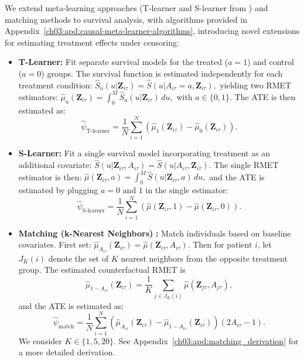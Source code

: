 We extend meta-learning approaches (T-learner and S-learner from \citet{kunzel2019metalearners}) and matching methods to survival analysis, with algorithms provided in Appendix~\ref{ch03:apd:causal-meta-learner-algorithms}, introducing novel extensions for estimating treatment effects under censoring:
\begin{itemize}\setlength{\itemsep}{0pt}
    \item \textbf{T-Learner:}
    Fit separate survival models for the treated (\(a=1\)) and control (\(a=0\)) groups. 
    The survival function is estimated independently for each treatment condition:
    \(
    \widehat{S}_a (u | \mathbf{Z}_{i\tau}) = {\widehat{S}(u | A_{i\tau} = a, \mathbf{Z}_{i\tau})},
    \)
    yielding two RMET estimators:
    \(
    \widehat{\mu}_a (\mathbf{Z}_{i\tau}) = \int_0^{M} \widehat{S}_a (u | \mathbf{Z}_{i\tau}) \, du,
    \)
    with \(a\in\{0,1\}\).
The ATE is then estimated as:
    \[
    \widehat{\psi}_{\text{T-learner}} = \frac{1}{N} \sum_{i=1}^{N} \left( \widehat{\mu}_1 (\mathbf{Z}_{i\tau}) - \widehat{\mu}_0 (\mathbf{Z}_{i\tau}) \right).
    \]

    \item \textbf{S-Learner:} Fit a single survival model incorporating treatment as an additional covariate:
    \(
    \widehat{S}(u | \mathbf{Z}_{i\tau}, A_{i\tau}) = \widehat{S}(u | A_{i\tau}, \mathbf{Z}_{i\tau}).
    \)
    The single RMET estimator is then:
    \(
    \widehat{\mu} (\mathbf{Z}_{i\tau}, a) = \int_0^{M} \widehat{S}(u | \mathbf{Z}_{i\tau}, a) \, du,
    \)
    and the ATE is estimated by plugging \(a=0\text{ and } 1\) in the single estimator:
    \[
    \widehat{\psi}_{\text{S-learner}} = \frac{1}{N} \sum_{i=1}^{N} \left( \widehat{\mu} (\mathbf{Z}_{i\tau},1) - \widehat{\mu} (\mathbf{Z}_{i\tau},0) \right).
    \]

    \item \textbf{Matching (k-Nearest Neighbors)} \citep{stuart2010matching}\textbf{:}  
    Match individuals based on baseline covariates. 
    First set: \(
    \widehat{\mu}_{A_{i\tau}} (\mathbf{Z}_{i\tau}) = \widehat{\mu} (\mathbf{Z}_{i\tau}, A_{i\tau})
    \).
    Then for patient \(i\), let \(J_K(i)\) denote the set of \(K\) nearest neighbors from the opposite treatment group.
The estimated counterfactual RMET is
    \[
    \widehat{\mu}_{1-A_{i\tau}}(\mathbf{Z}_{i\tau}) = \frac{1}{K} \sum_{j \in J_K(i)} \widehat{\mu}(\mathbf{Z}_{j\tau}, A_{j\tau}),
    \]
    and the ATE is estimated as:
    \footnotesize
    \[
    \widehat{\psi}_{\text{match}} = \frac{1}{N} \sum_{i=1}^{N} \left(\widehat{\mu}_{A_{i\tau}}(\mathbf{Z}_{i\tau}) - \widehat{\mu}_{1-A_{i\tau}}(\mathbf{Z}_{i\tau})\right)(2A_{i\tau} - 1).
    \]
    \normalsize
    We consider \(K \in \{1,5,20\}\).
    See Appendix~\ref{ch03:apd:matching_derivation} for a more detailed derivation.
    

\end{itemize}
